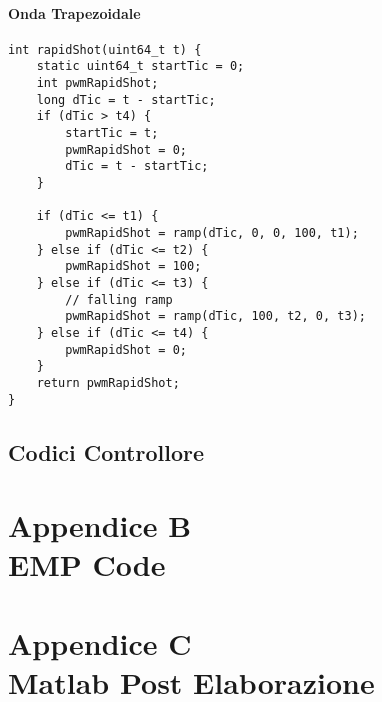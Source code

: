 \subsubsection{Onda Trapezoidale}
\begin{lstlisting}[style=cppStyle,caption={Onda Trapezoidale Periodica},label=lst:ondaTrapezoidale] 
int rapidShot(uint64_t t) {
	static uint64_t startTic = 0;
	int pwmRapidShot;
	long dTic = t - startTic;
	if (dTic > t4) {
		startTic = t;
		pwmRapidShot = 0;
		dTic = t - startTic;
	}
	
	if (dTic <= t1) {
		pwmRapidShot = ramp(dTic, 0, 0, 100, t1);
	} else if (dTic <= t2) {
		pwmRapidShot = 100;
	} else if (dTic <= t3) {
		// falling ramp
		pwmRapidShot = ramp(dTic, 100, t2, 0, t3);
	} else if (dTic <= t4) {
		pwmRapidShot = 0;
	}	
	return pwmRapidShot;
}
\end{lstlisting}

\newpage

\section{Codici Controllore}


\chapter*{Appendice B\\ EMP Code}\label{EMPCode}

\chapter*{Appendice C\\ Matlab Post Elaborazione}\label{MatlabCode}
